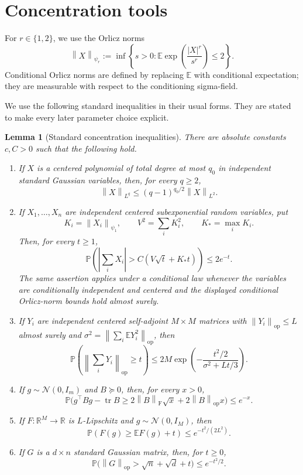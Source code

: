 \documentclass[11pt]{article}
\newtheorem{lemma}[theorem]{Lemma}
\theoremstyle{remark}
\newcommand{\R}{\mathbb R}
\newcommand{\E}{\mathbb E}
\newcommand{\Pp}{\mathbb P}
\newcommand{\norm}[1]{\left\lVert #1\right\rVert}
\newcommand{\op}{\mathrm{op}}
\newcommand{\F}{\mathrm{F}}
\newcommand{\1}{\mathbf 1}
\newcommand{\tr}{\operatorname{tr}}
\newcommand{\psiOne}{\psi_1}
\begin{document}
\section{Concentration tools}

For $r\in\{1,2\}$, we use the Orlicz norms
\[
 \norm X_{\psi_r}
 :=\inf\left\{s>0:
 \E\exp\!\left(\frac{|X|^r}{s^r}\right)\leq2\right\}.
\]
Conditional Orlicz norms are defined by replacing $\E$ with conditional
expectation; they are measurable with respect to the conditioning
sigma-field.

We use the following standard inequalities in their usual forms.
They are stated to make every later parameter choice explicit.

\begin{lemma}[Standard concentration inequalities]
\label{lem:standard-tools}
There are absolute constants $c,C>0$ such that the following hold.
\begin{enumerate}[label=(\roman*)]
\item If $X$ is a centered polynomial of total degree at most $q_0$ in
independent standard Gaussian variables, then, for every $q\geq2$,
\[
 \norm X_{L^q}\leq(q-1)^{q_0/2}\norm X_{L^2}.
\]
\item If $X_1,\ldots,X_n$ are independent centered subexponential
random variables, put
\[
 K_i=\norm{X_i}_{\psiOne},\qquad
 V^2=\sum_iK_i^2,\qquad K_\ast=\max_iK_i.
\]
Then, for every $t\geq1$,
\[
 \Pp\!\left(\left|\sum_iX_i\right|
 >C(V\sqrt t+K_\ast t)\right)\leq2e^{-t}.
\]
The same assertion applies under a conditional law whenever the
variables are conditionally independent and centered and the displayed
conditional Orlicz-norm bounds hold almost surely.
\item If $Y_i$ are independent centered self-adjoint $M\times M$
matrices with $\norm{Y_i}_{\op}\leq L$ almost surely and
$\sigma^2=\norm{\sum_i\E Y_i^2}_{\op}$, then
\[
 \Pp\!\left(\norm{\sum_iY_i}_{\op}\geq t\right)
 \leq2M\exp\!\left(-\frac{t^2/2}{\sigma^2+Lt/3}\right).
\]
\item If $g\sim\mathcal N(0,I_m)$ and $B\succeq0$, then, for every
$x>0$,
\[
 \Pp\bigl(g^\top Bg-\tr B
 \geq2\norm B_{\F}\sqrt x+2\norm B_{\op}x\bigr)\leq e^{-x}.
\]
\item If $F:\R^M\to\R$ is $L$-Lipschitz and $g\sim\mathcal N(0,I_M)$,
then
\[
 \Pp(F(g)\geq\E F(g)+t)\leq e^{-t^2/(2L^2)}.
\]
\item If $G$ is a $d\times n$ standard Gaussian matrix, then, for
$t\geq0$,
\[
 \Pp\bigl(\norm G_{\op}>\sqrt n+\sqrt d+t\bigr)\leq e^{-t^2/2}.
\]
\end{enumerate}
\end{lemma}
\end{document}
